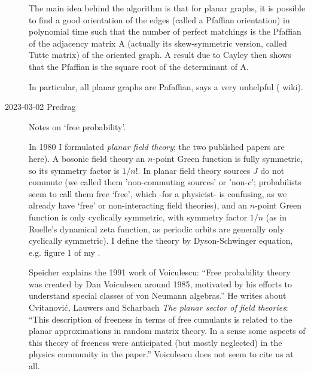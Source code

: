 \begin{description}
The main idea behind the algorithm is that for planar graphs, it is possible
to find a good orientation of the edges (called a Pfaffian orientation) in
polynomial time such that the number of perfect matchings is the Pfaffian of
the adjacency matrix A (actually its skew-symmetric version, called Tutte
matrix) of the oriented graph. A result due to Cayley then shows that the
Pfaffian is the square root of the determinant of A.

In particular, all planar graphs are Pafaffian, says a very unhelpful
( {wiki}).

   \item[2023-03-02 Predrag]
Notes on `free probability'.

In 1980 I formulated {\em planar field theory};
the two published papers are
 {here}).
A bosonic field theory an $n$-point Green function is fully symmetric, so its
symmetry factor is $1/n!$.
In planar field theory sources $J$ do not commute (we called them
'non-commuting sources' or 'non-$c$'; probabilists seem to call them free `free',
which -for a physicist- is confusing, as we already have `free' or
non-interacting field theories), and an
$n$-point Green function is only cyclically symmetric, with symmetry factor
$1/n$ (as in Ruelle's dynamical zeta function, as periodic orbits
are generally only cyclically symmetric). I define the theory by Dyson-Schwinger
equation, e.g. figure 1 of my
.

Speicher explains the 1991  work of Voiculescu: ``Free probability theory was
created by Dan Voiculescu around 1985, motivated by his efforts to
understand special classes of von Neumann algebras.'' He writes about
Cvitanovi{\'c}, Lauwers and Scharbach {\em The planar sector of
field theories}: ``This description of freeness in terms of free
cumulants is related to the planar approximations in random matrix theory.
In a sense some aspects of this theory of freeness were anticipated (but
mostly neglected) in the physics community in the  paper.''
Voiculescu does not seem to cite us at all.



\end{description}

